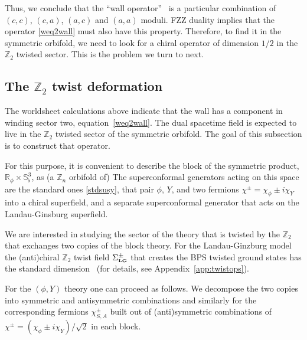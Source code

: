 \documentclass[12pt]{article}
\def\sqsphere{{\bS^3_\flat}}
\def\[{\left[}
\newcommand{\bR}{{\mathbb R}}
\newcommand{\bS}{{\mathbb S}}
\newcommand{\bZ}{{\mathbb Z}}
\numberwithin{equation}{section}
\def\sst{\scriptscriptstyle}
\def\LG{{\sst\bf LG}}
\begin{document}
Thus, we conclude that the ``wall operator'' \holoviol\ is a particular combination of $(c,c)$, $(c,a)$, $(a,c)$ and $(a,a)$ moduli. 
FZZ duality implies that the operator \eqref{weq2wall} must also have this property. Therefore, to find it in the symmetric orbifold, we need to look for a chiral operator of dimension $1/2$ in the $\bZ_2$ twisted sector. This is the problem we turn to next.

\subsection{The \texorpdfstring{$\bZ_2$}{} twist deformation}
\label{sec:Z2twist}

The worldsheet calculations above indicate that the wall has a component in winding sector two, equation~\eqref{weq2wall}. The dual spacetime field is expected to live in the $\bZ_2$ twisted sector of the symmetric orbifold. The goal of this subsection is to construct that operator. 

For this purpose, it is convenient to describe the block of the symmetric product, $\bR_\phi\times\sqsphere$, as (a $\bZ_n$ orbifold of)  
\eqn[rphiy]{
\bR_\phi\times\bS^1_Y\times LG_n ~.
}
The superconformal generators acting on this space are the standard ones \eqref{stdsusy}, that pair $\phi$, $Y$, and two fermions $\chi^\pm=\chi_\phi\pm i\chi_Y$ into a chiral superfield, and a separate superconformal generator that acts on the Landau-Ginsburg superfield. 

We are interested in studying the sector of the theory that is twisted by the $\bZ_2$ that exchanges two copies of the block theory. For the Landau-Ginzburg model the (anti)chiral $\bZ_2$ twist field $\Sigma^\pm_{\LG}$ that creates the BPS twisted ground states has the standard dimension~
\eqn[SigLGdim]{h\left[\Sigma_\LG^\pm\right]=\frac{c_\LG}{12}=\frac14-\frac1{2n}} 
(for details, see Appendix~\ref{app:twistops}).

For the $(\phi,Y)$ theory one can proceed as follows. We decompose the two copies into   
symmetric and antisymmetric combinations
and similarly for the corresponding fermions $\chi^\pm_{S,A}$ built out of (anti)symmetric combinations of $\chi^\pm=(\chi_\phi^{~}\pm i\chi_Y^{~})/\sqrt2$ in each block. 
\end{document}
